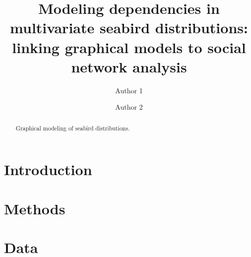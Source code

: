 \documentclass{statsoc}\usepackage[]{graphicx}\usepackage[]{color}
\title[Modeling dependencies in multivariate seabird distributions]{Modeling dependencies in multivariate seabird distributions: linking graphical models to social network analysis}
\author[Author 1 {\it et al.}]{Author 1}
\author{Author 2}
\begin{document}



\begin{abstract}
  Graphical modeling of seabird distributions.
\end{abstract}




\section{Introduction}


\section{Methods}

\section{Data}
\end{document}
